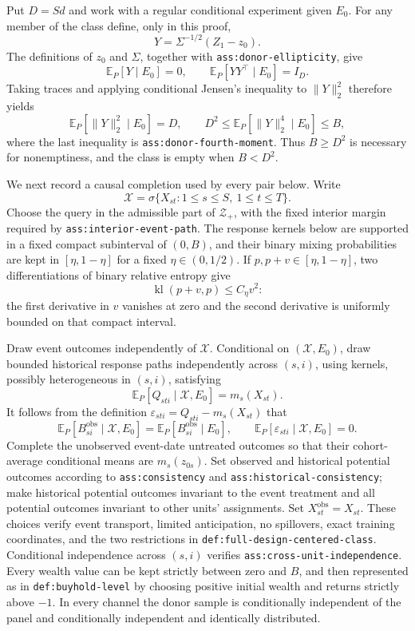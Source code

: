 Put \(D=Sd\) and work with a regular conditional experiment given \(E_0\).  For any member of the class define, only in this proof,
\[
Y=\Sigma^{-1/2}(Z_1-z_0).
\]
The definitions of \(z_0\) and \(\Sigma\), together with \texttt{ass:donor-ellipticity}, give
\[
\mathbb E_P[Y\mid E_0]=0,
\qquad
\mathbb E_P[YY^\top\mid E_0]=I_D.
\]
Taking traces and applying conditional Jensen's inequality to \(\|Y\|_2^2\) therefore yields
\[
\mathbb E_P[\|Y\|_2^2\mid E_0]=D,
\qquad
D^2\leq \mathbb E_P[\|Y\|_2^4\mid E_0]\leq B,
\tag{1}
\]
where the last inequality is \texttt{ass:donor-fourth-moment}.  Thus \(B\geq D^2\) is necessary for nonemptiness, and the class is empty when \(B<D^2\).

We next record a causal completion used by every pair below.  Write
\[
\mathscr X=\sigma\{X_{st}:1\leq s\leq S,\ 1\leq t\leq T\}.
\]
Choose the query in the admissible part of \(\mathcal Z_+\), with the fixed interior margin required by \texttt{ass:interior-event-path}.  The response kernels below are supported in a fixed compact subinterval of \((0,B)\), and their binary mixing probabilities are kept in \([\eta,1-\eta]\) for a fixed \(\eta\in(0,1/2)\).  If \(p,p+v\in[\eta,1-\eta]\), two differentiations of binary relative entropy give
\[
\operatorname{kl}(p+v,p)\leq C_\eta v^2:
\tag{2}
\]
the first derivative in \(v\) vanishes at zero and the second derivative is uniformly bounded on that compact interval.

Draw event outcomes independently of \(\mathscr X\).  Conditional on \((\mathscr X,E_0)\), draw bounded historical response paths independently across \((s,i)\), using kernels, possibly heterogeneous in \((s,i)\), satisfying
\[
\mathbb E_P[Q_{sti}\mid\mathscr X,E_0]=m_s(X_{st}).
\]
It follows from the definition \(\varepsilon_{sti}=Q_{sti}-m_s(X_{st})\) that
\[
\mathbb E_P[B_{si}^{\mathrm{obs}}\mid\mathscr X,E_0]
=\mathbb E_P[B_{si}^{\mathrm{obs}}\mid E_0],
\qquad
\mathbb E_P[\varepsilon_{sti}\mid\mathscr X,E_0]=0.
\tag{3}
\]
Complete the unobserved event-date untreated outcomes so that their cohort-average conditional means are \(m_s(z_{0s})\).  Set observed and historical potential outcomes according to \texttt{ass:consistency} and \texttt{ass:historical-consistency}; make historical potential outcomes invariant to the event treatment and all potential outcomes invariant to other units' assignments.  Set \(X_{st}^{\mathrm{obs}}=X_{st}\).  These choices verify event transport, limited anticipation, no spillovers, exact training coordinates, and the two restrictions in \texttt{def:full-design-centered-class}.  Conditional independence across \((s,i)\) verifies \texttt{ass:cross-unit-independence}.  Every wealth value can be kept strictly between zero and \(B\), and then represented as in \texttt{def:buyhold-level} by choosing positive initial wealth and returns strictly above \(-1\).  In every channel the donor sample is conditionally independent of the panel and conditionally independent and identically distributed.


